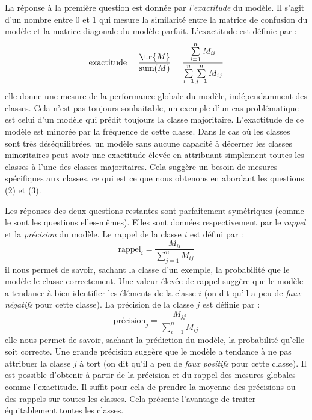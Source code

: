 La réponse à la première question est donnée par \emph{l'exactitude} du modèle.
Il s'agit d'un nombre entre 0 et 1 qui mesure la similarité entre 
la matrice de confusion du modèle et la matrice diagonale du modèle parfait.
L'exactitude est définie par :
\begin{equation}
    \label{eq.accuracy}
    \text{exactitude} =  \frac{\tr{M}}{\text{sum}(M)} 
                      = \frac{\sum\limits_{i=1}^n M_{ii}}{\sum\limits_{i=1}^n \sum\limits_{j=1}^n M_{ij}}
\end{equation}
elle donne une mesure de la performance globale du modèle, indépendamment des classes.
Cela n'est pas toujours souhaitable,
un exemple d'un cas problématique est celui d'un modèle qui prédit toujours la classe majoritaire.
L'exactitude de ce modèle est minorée par la fréquence de cette classe.
Dans le cas où les classes sont très déséquilibrées,
un modèle sans aucune capacité à décerner les classes minoritaires peut avoir une exactitude élevée
en attribuant simplement toutes les classes à l'une des classes majoritaires.
Cela suggère un besoin de mesures spécifiques aux classes,
ce qui est ce que nous obtenons en abordant les questions (2) et (3).

Les réponses des deux questions restantes sont parfaitement symétriques (comme le sont les questions elles-mêmes).
Elles sont données respectivement par le \emph{rappel} et la \emph{précision} du modèle.
Le rappel de la classe \(i\) est défini par :
\begin{equation}
    \label{eq.recall}
    \text{rappel}_i = \frac{M_{ii}}{\sum\limits_{j=1}^n M_{ij}}
\end{equation}
il nous permet de savoir, sachant la classe d'un exemple, la probabilité que le modèle le classe correctement.
Une valeur élevée de rappel suggère que le modèle a tendance à bien identifier les éléments de la classe \(i\)
(on dit qu'il a peu de \emph{faux négatifs} pour cette classe).
La précision de la classe \(j\) est définie par :
\begin{equation}
    \label{eq.precision}
    \text{précision}_j = \frac{M_{jj}}{\sum\limits_{i=1}^n M_{ij}}
\end{equation}
elle nous permet de savoir, sachant la prédiction du modèle, la probabilité qu'elle soit correcte.
Une grande précision suggère que le modèle a tendance à ne pas attribuer la classe \(j\) à tort
(on dit qu'il a peu de \emph{faux positifs} pour cette classe).
Il est possible d'obtenir à partir de la précision et du rappel des mesures globales comme l'exactitude.
Il suffit pour cela de prendre la moyenne des précisions ou des rappels sur toutes les classes.
Cela présente l'avantage de traiter équitablement toutes les classes.

